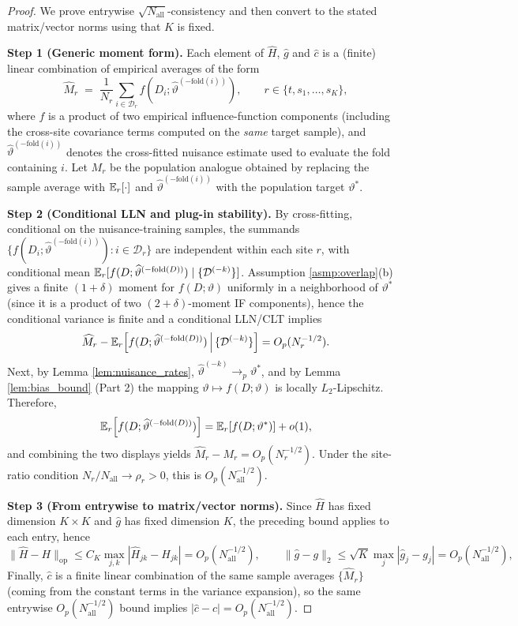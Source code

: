 \documentclass{article}
\begin{document}
\begin{proof}
We prove entrywise $\sqrt{N_{\mathrm{all}}}$-consistency and then convert to the stated matrix/vector norms using that $K$ is fixed.

\textbf{Step 1 (Generic moment form).}
Each element of $\widehat{H}$, $\widehat{g}$ and $\widehat{c}$ is a (finite) linear combination of empirical averages of the form
\[
\widehat{M}_{r} \;=\; \frac{1}{N_r}\sum_{i\in\mathcal{D}_r} f(D_i;\widehat{\vartheta}^{(-\mathrm{fold}(i))}),
\qquad r\in\{t,s_1,\ldots,s_K\},
\]
where $f$ is a product of two empirical influence-function components (including the cross-site covariance terms computed on the \emph{same} target sample), and $\widehat{\vartheta}^{(-\mathrm{fold}(i))}$ denotes the cross-fitted nuisance estimate used to evaluate the fold containing $i$.
Let $M_r$ be the population analogue obtained by replacing the sample average with $\operatorname{\mathbb{E}}_r[\cdot]$ and $\widehat{\vartheta}^{(-\mathrm{fold}(i))}$ with the population target $\vartheta^*$.

\textbf{Step 2 (Conditional LLN and plug-in stability).}
By cross-fitting, conditional on the nuisance-training samples, the summands $\{f(D_i;\widehat{\vartheta}^{(-\mathrm{fold}(i))}):i\in\mathcal{D}_r\}$ are independent within each site $r$, with conditional mean $\operatorname{\mathbb{E}}_r[f(D;\widehat{\vartheta}^{(-\mathrm{fold}(D))})\mid \{\mathcal{D}^{(-k)}\}]$.
Assumption \ref{asmp:overlap}(b) gives a finite $(1+\delta)$ moment for $f(D;\vartheta)$ uniformly in a neighborhood of $\vartheta^*$ (since it is a product of two $(2+\delta)$-moment IF components), hence the conditional variance is finite and a conditional LLN/CLT implies
\[
\widehat{M}_r - \operatorname{\mathbb{E}}_r\!\left[f(D;\widehat{\vartheta}^{(-\mathrm{fold}(D))})\,\middle|\, \{\mathcal{D}^{(-k)}\}\right]
= O_p(N_r^{-1/2}).
\]
Next, by Lemma \ref{lem:nuisance_rates}, $\widehat{\vartheta}^{(-k)}\to_p \vartheta^*$, and by Lemma \ref{lem:bias_bound} (Part 2) the mapping $\vartheta\mapsto f(D;\vartheta)$ is locally $L_2$-Lipschitz. Therefore,
\[
\operatorname{\mathbb{E}}_r\!\left[f(D;\widehat{\vartheta}^{(-\mathrm{fold}(D))})\right]
=
\operatorname{\mathbb{E}}_r[f(D;\vartheta^*)] + o(1),
\]
and combining the two displays yields $\widehat{M}_r-M_r=O_p(N_r^{-1/2})$.
Under the site-ratio condition $N_r/N_{\mathrm{all}}\to\rho_r>0$, this is $O_p(N_{\mathrm{all}}^{-1/2})$.

\textbf{Step 3 (From entrywise to matrix/vector norms).}
Since $\widehat{H}$ has fixed dimension $K\times K$ and $\widehat{g}$ has fixed dimension $K$, the preceding bound applies to each entry, hence
\[
\|\widehat{H}-H\|_{\mathrm{op}}
\le
C_K\max_{j,k}|\widehat{H}_{jk}-H_{jk}|
=
O_p(N_{\mathrm{all}}^{-1/2}),
\qquad
\|\widehat{g}-g\|_2
\le
\sqrt{K}\max_j|\widehat{g}_j-g_j|
=
O_p(N_{\mathrm{all}}^{-1/2}),
\]
Finally, $\widehat{c}$ is a finite linear combination of the same sample averages $\{\widehat{M}_r\}$ (coming from the constant terms in the variance expansion), so the same entrywise $O_p(N_{\mathrm{all}}^{-1/2})$ bound implies $|\widehat{c}-c|=O_p(N_{\mathrm{all}}^{-1/2})$.


\end{proof}
\end{document}
